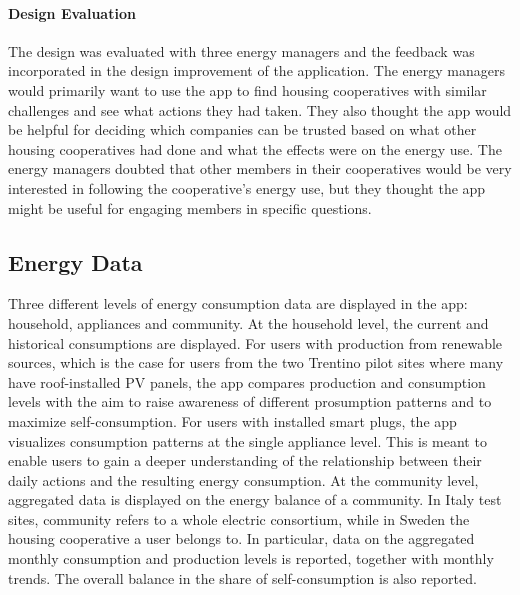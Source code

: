 \paragraph{Design Evaluation}

The design was evaluated with three energy managers and the feedback was incorporated in the design improvement of the application. The energy managers would primarily want to use the app to find housing cooperatives with similar challenges and see what actions they had taken. They also thought the app would be helpful for deciding which companies can be trusted based on what other housing cooperatives had done and what the effects were on the energy use. The energy managers doubted that other members in their cooperatives would be very interested in following the cooperative's energy use, but they thought the app might be useful for engaging members in specific questions. 

\subsection{Energy Data} 
\label{sect:load_shifting}

Three different levels of energy consumption data are displayed in the app: household, appliances and community. 
At the household level, the current and historical consumptions are displayed. For users with production from renewable sources, which is the case for users from the two Trentino pilot sites where many have roof-installed PV panels, the app compares production and consumption levels with the aim to raise awareness of different prosumption patterns and to maximize self-consumption. 
% 
For users with installed smart plugs, the app visualizes consumption patterns at the single appliance level. This is meant to enable users to gain a deeper understanding of the relationship between their daily actions and the resulting energy consumption. 
%
At the community level, aggregated data is displayed on the energy balance of a community. In Italy test sites, community refers to a whole electric consortium, while in Sweden the housing cooperative a user belongs to. 
In particular, data on the aggregated monthly consumption and production levels is reported, together with monthly trends. The overall balance in the share of self-consumption is also reported. 

